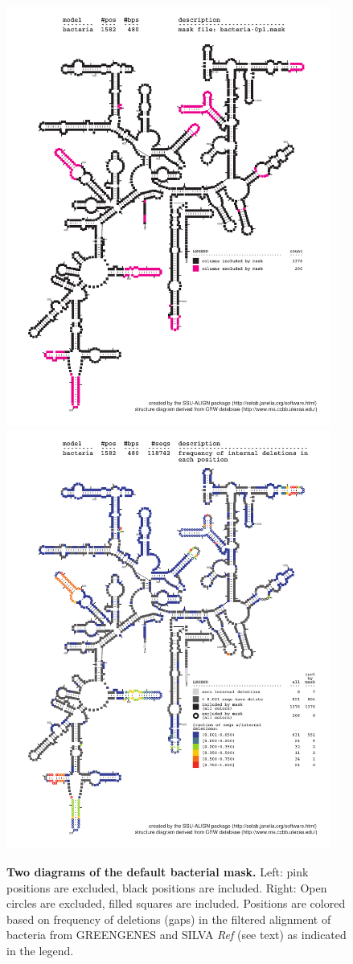 \begin{figure}
  \begin{center}
\includegraphics[width=4.2in]{Figures/bacteria-0p1-mask}
\includegraphics[width=4.2in]{Figures/bacteria-ggsilR-dint-wmask}
  \end{center}
\caption{\textbf{Two diagrams of the default bacterial mask.} Left: pink positions are excluded,
  black positions are included. Right: Open circles are excluded,
  filled squares are included. Positions are colored based on
  frequency of deletions (gaps) in the filtered alignment of bacteria
  from GREENGENES and SILVA \emph{Ref} (see text) as
  indicated in the legend.}
\label{fig:mask-bac}
\end{figure}

